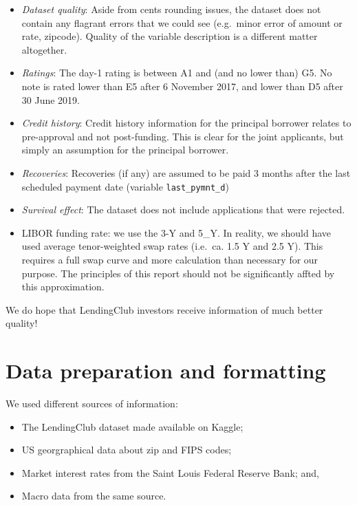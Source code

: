 \documentclass[11pt,]{report}
\begin{document}
\begin{itemize}
\item
  \emph{Dataset quality}: Aside from cents rounding issues, the dataset does not contain any flagrant errors that we could see (e.g.~minor error of amount or rate, zipcode). Quality of the variable description is a different matter altogether.
\item
  \emph{Ratings}: The day-1 rating is between A1 and (and no lower than) G5. No note is rated lower than E5 after 6 November 2017, and lower than D5 after 30 June 2019.
\item
  \emph{Credit history}: Credit history information for the principal borrower relates to pre-approval and not post-funding. This is clear for the joint applicants, but simply an assumption for the principal borrower.
\item
  \emph{Recoveries}: Recoveries (if any) are assumed to be paid 3 months after the last scheduled payment date (variable \texttt{last\_pymnt\_d})
\item
  \emph{Survival effect}: The dataset does not include applications that were rejected.
\item
  LIBOR funding rate: we use the 3-Y and 5\_Y. In reality, we should have used average tenor-weighted swap rates (i.e.~ca. 1.5 Y and 2.5 Y). This requires a full swap curve and more calculation than necessary for our purpose. The principles of this report should not be significantly affted by this approximation.
\end{itemize}

We do hope that LendingClub investors receive information of much better quality!

\hypertarget{data-preparation-and-formatting}{%
\section{Data preparation and formatting}\label{data-preparation-and-formatting}}

We used different sources of information:

\begin{itemize}
\item
  The LendingClub dataset made available on Kaggle;
\item
  US georgraphical data about zip and FIPS codes;
\item
  Market interest rates from the Saint Louis Federal Reserve Bank; and,
\item
  Macro data from the same source.
\end{itemize}
\end{document}
